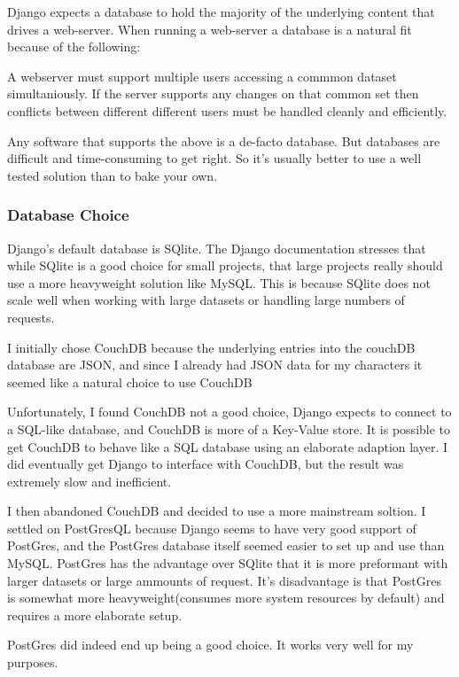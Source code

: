 Django expects a database to hold the majority of the underlying content that drives a web-server.  When running a web-server a database is a natural fit because of the following:

A webserver must support multiple users accessing a commmon dataset simultaniously.
If the server supports any changes on that common set then conflicts between different different users must be handled cleanly and efficiently.

Any software that supports the above is a de-facto database.  But databases are difficult and time-consuming to get right.  So it's usually better to use a well tested solution than to bake your own.

\subsubsection{Database Choice}

Django's default database is SQlite.  The Django documentation stresses that while SQlite is a good choice for small  projects, that large projects really should use a more heavyweight solution like MySQL.  This is because SQlite does not scale well when working with large datasets or handling large numbers of requests.

I initially chose CouchDB because the underlying entries into the couchDB database are JSON, and since I already had JSON data for my characters it seemed like a natural choice to use CouchDB

Unfortunately, I found CouchDB not a good choice, Django expects to connect to a SQL-like database, and CouchDB is more of a Key-Value store.  It is possible to get CouchDB to behave like a SQL database using an elaborate adaption layer.  I did eventually get Django to interface with CouchDB, but the result was extremely slow and inefficient.

I then abandoned CouchDB and decided to use a more mainstream soltion.  I settled on PostGresQL because Django seems to have very good support of PostGres, and the PostGres database itself seemed easier to set up and use than MySQL.  PostGres has the advantage over SQlite that it is more preformant with larger datasets or large ammounts of request.  It's disadvantage is that PostGres is somewhat more heavyweight(consumes more system resources by default) and requires a more elaborate setup.

PostGres did indeed end up being a good choice.  It works very well for my purposes.

